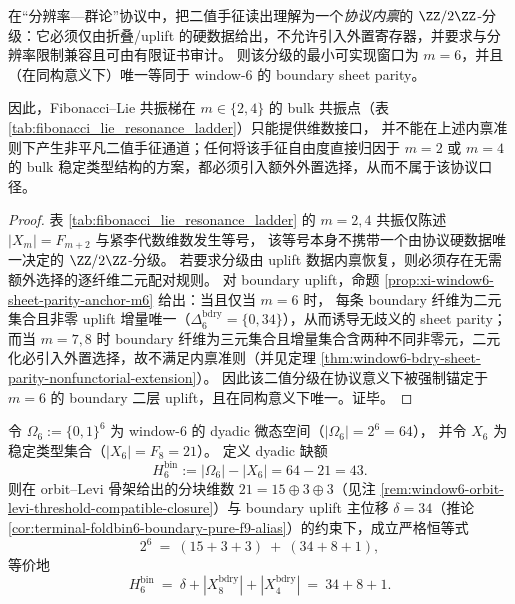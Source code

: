 \begin{theorem}\label{thm:window6-chirality-anchor-minimal}
在“分辨率—群论”协议中，把二值手征读出理解为一个\emph{协议内禀}的 \(\ZZ/2\ZZ\)-分级：它必须仅由折叠/uplift 的硬数据给出，不允许引入外置寄存器，并要求与分辨率限制兼容且可由有限证书审计。
则该分级的最小可实现窗口为 \(m=6\)，并且（在同构意义下）唯一等同于 window-\(6\) 的 boundary sheet parity。
\par
因此，Fibonacci--Lie 共振梯在 \(m\in\{2,4\}\) 的 bulk 共振点（表 \ref{tab:fibonacci_lie_resonance_ladder}）只能提供维数接口，
并不能在上述内禀准则下产生非平凡二值手征通道；任何将该手征自由度直接归因于 \(m=2\) 或 \(m=4\) 的 bulk 稳定类型结构的方案，都必须引入额外外置选择，从而不属于该协议口径。
\end{theorem}

\begin{proof}
表 \ref{tab:fibonacci_lie_resonance_ladder} 的 \(m=2,4\) 共振仅陈述 \(|X_m|=F_{m+2}\) 与紧李代数维数发生等号，
该等号本身不携带一个由协议硬数据唯一决定的 \(\ZZ/2\ZZ\)-分级。
若要求分级由 uplift 数据内禀恢复，则必须存在无需额外选择的逐纤维二元配对规则。
对 boundary uplift，命题 \ref{prop:xi-window6-sheet-parity-anchor-m6} 给出：当且仅当 \(m=6\) 时，
每条 boundary 纤维为二元集合且非零 uplift 增量唯一（\(\Delta_6^{\mathrm{bdry}}=\{0,34\}\)），从而诱导无歧义的 sheet parity；
而当 \(m=7,8\) 时 boundary 纤维为三元集合且增量集合含两种不同非零元，二元化必引入外置选择，故不满足内禀准则（并见定理 \ref{thm:window6-bdry-sheet-parity-nonfunctorial-extension}）。
因此该二值分级在协议意义下被强制锚定于 \(m=6\) 的 boundary 二层 uplift，且在同构意义下唯一。证毕。
\end{proof}

\begin{proposition}\label{prop:window6-dyadic-budget-three-stage}
令 \(\Omega_6:=\{0,1\}^6\) 为 window-\(6\) 的 dyadic 微态空间（\(|\Omega_6|=2^6=64\)），
并令 \(X_6\) 为稳定类型集合（\(|X_6|=F_8=21\)）。
定义 dyadic 缺额
\[
H^{\mathrm{bin}}_6:=|\Omega_6|-|X_6|=64-21=43.
\]
则在 orbit--Levi 骨架给出的分块维数 \(21=15\oplus 3\oplus 3\)（见注 \ref{rem:window6-orbit-levi-threshold-compatible-closure}）与 boundary uplift 主位移 \(\delta=34\)（推论 \ref{cor:terminal-foldbin6-boundary-pure-f9-alias}）的约束下，成立严格恒等式
\[
2^6\ =\ (15+3+3)\ +\ (34+8+1),
\]
等价地
\[
H^{\mathrm{bin}}_6\ =\ \delta+|X^{\mathrm{bdry}}_8|+|X^{\mathrm{bdry}}_4|
\ =\ 34+8+1.
\]
\end{proposition}

